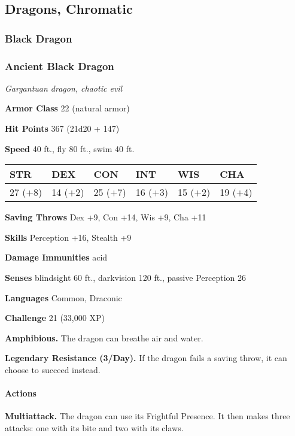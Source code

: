 \documentclass[
]{article}
\begin{document}
\hypertarget{dragons-chromatic}{%
\subsection{Dragons, Chromatic}\label{dragons-chromatic}}

\hypertarget{black-dragon}{%
\subsubsection{Black Dragon}\label{black-dragon}}

\hypertarget{ancient-black-dragon}{%
\subsubsection{Ancient Black Dragon}\label{ancient-black-dragon}}

\emph{Gargantuan dragon, chaotic evil}

\textbf{Armor Class} 22 (natural armor)

\textbf{Hit Points} 367 (21d20 + 147)

\textbf{Speed} 40 ft., fly 80 ft., swim 40 ft.

\begin{longtable}[]{@{}llllll@{}}
\toprule
STR & DEX & CON & INT & WIS & CHA\tabularnewline
\midrule
\endhead
27 (+8) & 14 (+2) & 25 (+7) & 16 (+3) & 15 (+2) & 19 (+4)\tabularnewline
\bottomrule
\end{longtable}

\textbf{Saving Throws} Dex +9, Con +14, Wis +9, Cha +11

\textbf{Skills} Perception +16, Stealth +9

\textbf{Damage Immunities} acid

\textbf{Senses} blindsight 60 ft., darkvision 120 ft., passive
Perception 26

\textbf{Languages} Common, Draconic

\textbf{Challenge} 21 (33,000 XP)

\textbf{Amphibious.} The dragon can breathe air and water.

\textbf{Legendary Resistance (3/Day).} If the dragon fails a saving
throw, it can choose to succeed instead.

\hypertarget{actions-23}{%
\paragraph{Actions}\label{actions-23}}

\textbf{Multiattack.} The dragon can use its Frightful Presence. It then
makes three attacks: one with its bite and two with its claws.
\end{document}
